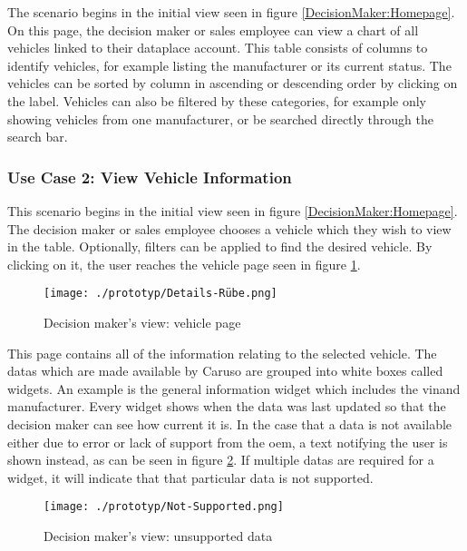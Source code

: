 The scenario begins in the initial view seen in figure \ref{DecisionMaker:Homepage}. On this page, the decision maker or sales employee can view a chart of all vehicles linked to their \gls{dataplace} account. This table consists of columns to identify vehicles, for example listing the manufacturer or its current status. The vehicles can be sorted by column in ascending or descending order by clicking on the label. Vehicles can also be filtered by these categories, for example only showing vehicles from one manufacturer, or be searched directly through the search bar.

\subsubsection{Use Case 2: View Vehicle Information}

This scenario begins in the initial view seen in figure \ref{DecisionMaker:Homepage}. The decision maker or sales employee chooses a vehicle which they wish to view in the table. Optionally, filters can be applied to find the desired vehicle. By clicking on it, the user reaches the vehicle page seen in figure \ref{DecisionMaker:DetailsRube}.

\begin{figure}[ht]
  \centering
  \texttt{[image: ./prototyp/Details-Rübe.png]}
  \caption{Decision maker's view: vehicle page}
  \label{DecisionMaker:DetailsRube}
\end{figure}

This page contains all of the information relating to the selected vehicle. The \glspl{data} which are made available by Caruso are grouped into white boxes called \glspl{widget}. An example is the general information \gls{widget} which includes the \gls{vin}and manufacturer. Every \gls{widget} shows when the data was last updated so that the decision maker can see how current it is. In the case that a \gls{data} is not available either due to error or lack of support from the \gls{oem}, a text notifying the user is shown instead, as can be seen in figure \ref{DecisionMaker:NotSupported}. If multiple \glspl{data} are required for a \gls{widget}, it will indicate that that particular \gls{data} is not supported.


\begin{figure}[ht]
  \centering
  \texttt{[image: ./prototyp/Not-Supported.png]}
  \caption{Decision maker's view: unsupported \gls{data}}
  \label{DecisionMaker:NotSupported}
\end{figure}

